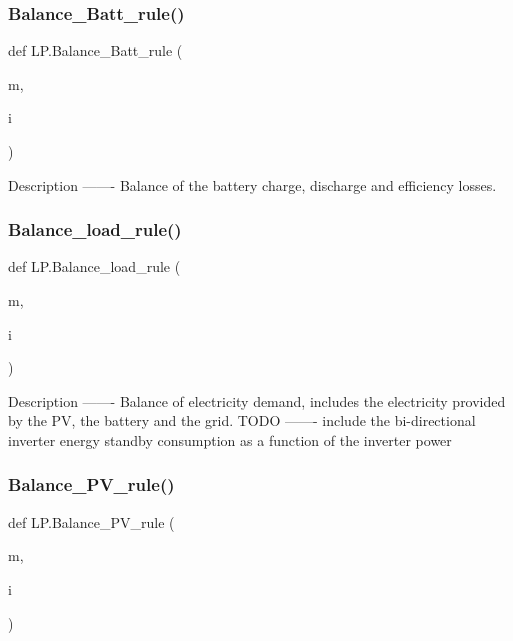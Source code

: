 \subsubsection{\texorpdfstring{Balance\+\_\+\+Batt\+\_\+rule()}{Balance\_Batt\_rule()}}
{\footnotesize\ttfamily def L\+P.\+Balance\+\_\+\+Batt\+\_\+rule (\begin{DoxyParamCaption}\item[{}]{m,  }\item[{}]{i }\end{DoxyParamCaption})}

\begin{DoxyVerb}Description
-------
Balance of the battery charge, discharge and efficiency losses.
\end{DoxyVerb}
 \mbox{\label{namespace_l_p_a7995ecb2641ea88b0911ec2aeca541ca}} 
\subsubsection{\texorpdfstring{Balance\+\_\+load\+\_\+rule()}{Balance\_load\_rule()}}
{\footnotesize\ttfamily def L\+P.\+Balance\+\_\+load\+\_\+rule (\begin{DoxyParamCaption}\item[{}]{m,  }\item[{}]{i }\end{DoxyParamCaption})}

\begin{DoxyVerb}Description
-------
Balance of electricity demand, includes the electricity provided by the PV, the battery and the grid.
TODO
-------
include the bi-directional inverter energy standby consumption as a function
of the inverter power
\end{DoxyVerb}
 \mbox{\label{namespace_l_p_aaa5c98af22d032fe4789fbf07ff0f7fb}} 
\subsubsection{\texorpdfstring{Balance\+\_\+\+P\+V\+\_\+rule()}{Balance\_PV\_rule()}}
{\footnotesize\ttfamily def L\+P.\+Balance\+\_\+\+P\+V\+\_\+rule (\begin{DoxyParamCaption}\item[{}]{m,  }\item[{}]{i }\end{DoxyParamCaption})}

